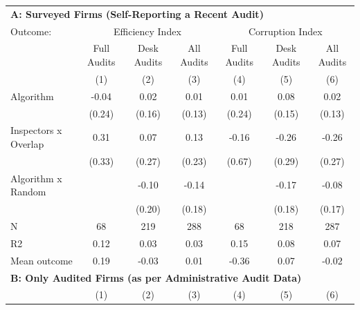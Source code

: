 \begin{tabular}{lccc|ccc} \toprule
\multicolumn{7}{l}{\textbf{A: Surveyed Firms (Self-Reporting a Recent Audit)}} \\ \multicolumn{1}{l}{Outcome:} & \multicolumn{3}{c}{Efficiency Index} & \multicolumn{3}{c}{Corruption Index} \\ \multicolumn{1}{l}{} & Full Audits & Desk Audits & All Audits & Full Audits & Desk Audits & All Audits \\ \multicolumn{1}{l}{} & (1) & (2) & (3) & (4) & (5) & (6) \\ \midrule
Algorithm   &       -0.04         &        0.02         &        0.01         &        0.01         &        0.08         &        0.02         \\
            &      (0.24)         &      (0.16)         &      (0.13)         &      (0.24)         &      (0.15)         &      (0.13)         \\
\addlinespace
Inspectors x Overlap&        0.31         &        0.07         &        0.13         &       -0.16         &       -0.26         &       -0.26         \\
            &      (0.33)         &      (0.27)         &      (0.23)         &      (0.67)         &      (0.29)         &      (0.27)         \\
\addlinespace
Algorithm x Random&                     &       -0.10         &       -0.14         &                     &       -0.17         &       -0.08         \\
            &                     &      (0.20)         &      (0.18)         &                     &      (0.18)         &      (0.17)         \\
\midrule
N           &          68         &         219         &         288         &          68         &         218         &         287         \\
R2          &        0.12         &        0.03         &        0.03         &        0.15         &        0.08         &        0.07         \\
Mean outcome&        0.19         &       -0.03         &        0.01         &       -0.36         &        0.07         &       -0.02         \\

\midrule \multicolumn{7}{l}{\textbf{B: Only Audited Firms (as per Administrative Audit Data)}} \\ \multicolumn{1}{l}{} & (1) & (2) & (3) & (4) & (5) & (6) \\ \midrule


\end{tabular}
